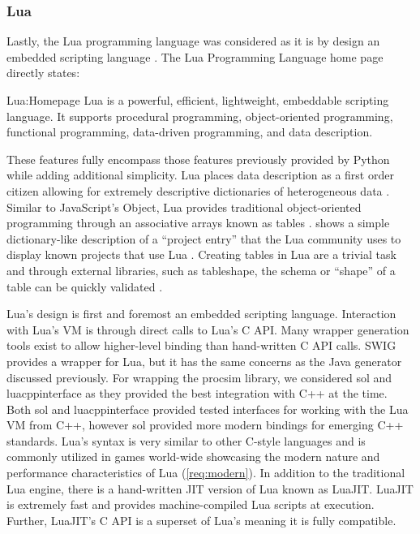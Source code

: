 \subsubsection{Lua}

Lastly, the Lua programming language was considered as it is by design an embedded scripting language \cite{Lua:Homepage}. The Lua Programming Language home page directly states: 
\begin{displaycquote}{Lua:Homepage}
    Lua is a powerful, efficient, lightweight, embeddable scripting language. It supports procedural programming, object-oriented programming, functional programming, data-driven programming, and data description.
\end{displaycquote}
\noindent These features fully encompass those features previously provided by Python while adding additional simplicity. Lua places data description as a first order citizen allowing for extremely descriptive dictionaries of heterogeneous data \cite{Ierusalimschy:PIL}. Similar to JavaScript's Object, Lua provides traditional object-oriented programming through an associative arrays known as tables \cite{MDN:Object, Ierusalimschy:PIL}.  shows a simple dictionary-like description of a ``project entry'' that the Lua community uses to display known projects that use Lua \cite{Lua:WhereIsLuaUsed}. Creating tables in Lua are a trivial task and through external libraries, such as tableshape, the schema or ``shape'' of a table can be quickly validated \cite{GitHub:leafto:tableshape}. 

Lua's design is first and foremost an embedded scripting language. Interaction with Lua's VM is through direct calls to Lua's C API. Many wrapper generation tools exist to allow higher-level binding than hand-written C API calls. SWIG provides a wrapper for Lua, but it has the same concerns as the Java generator discussed previously. For wrapping the procsim library, we considered sol \cite{GitHub:Rapptz:Sol} and luacppinterface \cite{GitHub:davidsiaw:luacppinterface} as they provided the best integration with C++ at the time. Both sol and luacppinterface provided tested interfaces for working with the Lua VM from C++, however sol provided more modern bindings for emerging C++ standards. Lua's syntax is very similar to other C-style languages and is commonly utilized in games world-wide showcasing the modern nature and performance characteristics of Lua (\cref{req:modern}). In addition to the traditional Lua engine, there is a hand-written JIT version of Lua known as LuaJIT. LuaJIT is extremely fast and provides machine-compiled Lua scripts at execution. Further, LuaJIT's C API is a superset of Lua's meaning it is fully compatible. 

